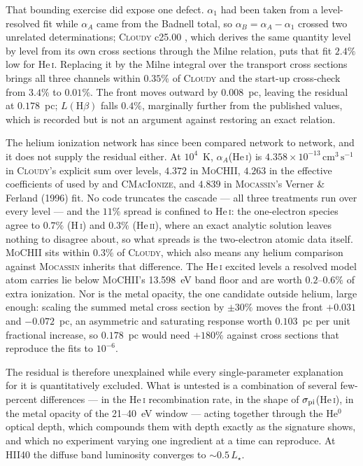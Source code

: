 \documentclass[twocolumn,linenumbers]{aastex702}
\newcommand{\MoCHII}{\textsc{MoCHII}}
\newcommand{\HI}{H\,\textsc{i}}
\newcommand{\HeI}{He\,\textsc{i}}
\newcommand{\HeII}{He\,\textsc{ii}}
\newcommand{\cmc}{\mathrm{cm^{3}\,s^{-1}}}
\begin{document}
That bounding exercise did expose one defect.  $\alpha_1$ had been taken
from a level-resolved fit \citep{mao2016} while $\alpha_A$ came from the
Badnell total, so $\alpha_B = \alpha_A - \alpha_1$ crossed two unrelated
determinations; \textsc{Cloudy} c25.00 \citep{cloudy2025}, which derives the
same quantity level by level from its own cross sections through the Milne
relation, puts that fit $2.4\%$ low for \HeI.  Replacing it by the Milne
integral over the transport cross sections brings all three channels within
$0.35\%$ of \textsc{Cloudy} and the start-up cross-check from $3.4\%$ to
$0.01\%$.  The front moves outward by $0.008$~pc, leaving the residual at
$0.178$~pc; $L(\mathrm{H}\beta)$ falls $0.4\%$, marginally further from the
published values, which is recorded but is not an argument against restoring
an exact relation.

The helium ionization network has since been compared network to network,
and it does not supply the residual either.  At $10^{4}$~K,
$\alpha_A$(\HeI) is $4.358 \times 10^{-13}\,\cmc$ in \textsc{Cloudy}'s
explicit sum over levels, $4.372$ in \MoCHII, $4.263$ in the effective
coefficients of \citet{benjamin1999} used by \citet{wood2004} and
\textsc{CMacIonize}, and $4.839$ in \textsc{Mocassin}'s Verner \& Ferland
(1996) fit.  No code truncates the cascade --- all three treatments run over every
level --- and the $11\%$ spread is confined to \HeI: the one-electron species
agree to $0.7\%$ (\HI) and $0.3\%$ (\HeII), where an exact analytic solution
leaves nothing to disagree about, so what spreads is the two-electron atomic
data itself.  \MoCHII{} sits within $0.3\%$ of \textsc{Cloudy}, which also
means any helium comparison against \textsc{Mocassin} inherits that
difference.  The \HeI{} excited levels a resolved model atom carries lie
below \MoCHII's 13.598~eV band floor and are worth $0.2$--$0.6\%$ of extra
ionization.  Nor is the metal opacity, the one candidate outside helium,
large enough: scaling the summed metal cross section by $\pm30\%$ moves the
front $+0.031$ and $-0.072$~pc, an asymmetric and saturating response worth
$0.103$~pc per unit fractional increase, so $0.178$~pc would need $+180\%$
against cross sections that reproduce the \citet{verner1996} fits to
$10^{-6}$.

The residual is therefore unexplained while every single-parameter
explanation for it is quantitatively excluded.  What is untested is a
combination of several few-percent differences --- in the \HeI{}
recombination rate, in the shape of $\sigma_{\rm pi}$(\HeI), in the metal
opacity of the 21--40~eV window --- acting together through the He$^{0}$
optical depth, which compounds them with depth exactly as the signature
shows, and which no experiment varying one ingredient at a time can
reproduce.  At HII40 the diffuse band luminosity
converges to $\sim$$0.5\,L_\star$.
\end{document}
